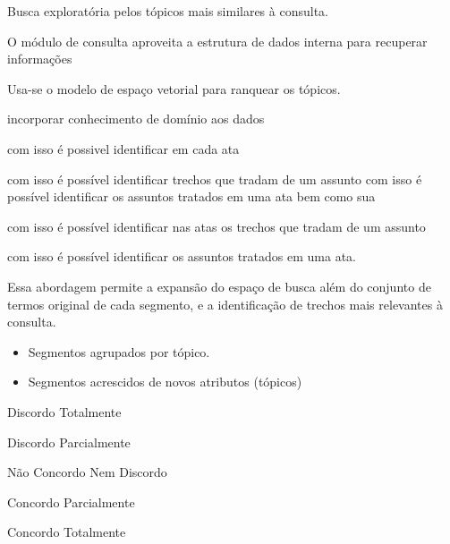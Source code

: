 Busca exploratória pelos tópicos mais similares à consulta.







O módulo de consulta aproveita a estrutura de dados interna para recuperar informações

Usa-se o modelo de espaço vetorial para ranquear os tópicos.








incorporar conhecimento de domínio aos dados












com isso é possivel identificar em cada ata

com isso é possível identificar trechos que tradam de um assunto
com isso é possível identificar os assuntos tratados em uma ata bem como sua 

com isso é possível identificar nas atas os trechos que tradam de um assunto


com isso é possível identificar os assuntos tratados em uma ata. 



Essa abordagem permite a expansão do espaço de busca além do conjunto de termos original de cada segmento, e a identificação de trechos mais relevantes à consulta.






 {
	\begin{itemize}
		\item  Segmentos agrupados por tópico.
		\item  Segmentos acrescidos de novos atributos (tópicos)
	\end{itemize}
}




\begin{center}
    \begin{minipage}{0.5\textwidth}
		\begin{description} \tiny
			\item[DT] Discordo Totalmente
			\item[DP] Discordo Parcialmente
			\item[NCND] Não Concordo Nem Discordo
			\item[CP] Concordo Parcialmente
			\item[CT] Concordo Totalmente
		\end{description}
    \end{minipage}
  \end{center}



